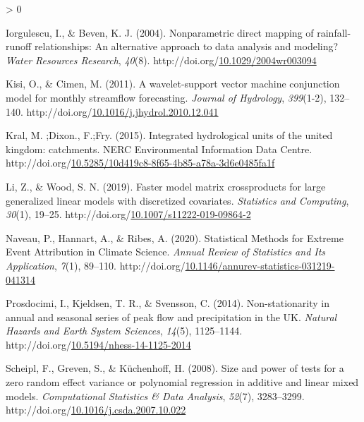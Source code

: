 \documentclass[12pt,oneside]{reedthesis}
\newlength{\cslhangindent}
\newenvironment{CSLReferences}[2] %
 {%
  \setlength{\parindent}{0pt}
  \ifodd #1 \everypar{\setlength{\hangindent}{\cslhangindent}}\ignorespaces\fi
  \ifnum #2 > 0
  \setlength{\parskip}{#2\baselineskip}
  \fi
 }%
 {}
\begin{document}
\begin{CSLReferences}{1}{0}
\leavevmode\hypertarget{ref-iorgulescu2004}{}%
Iorgulescu, I., \& Beven, K. J. (2004). Nonparametric direct mapping of rainfall-runoff relationships: An alternative approach to data analysis and modeling? \emph{Water Resources Research}, \emph{40}(8). http://doi.org/\href{https://doi.org/10.1029/2004wr003094}{10.1029/2004wr003094}

\leavevmode\hypertarget{ref-kisi2011}{}%
Kisi, O., \& Cimen, M. (2011). A wavelet-support vector machine conjunction model for monthly streamflow forecasting. \emph{Journal of Hydrology}, \emph{399}(1-2), 132--140. http://doi.org/\href{https://doi.org/10.1016/j.jhydrol.2010.12.041}{10.1016/j.jhydrol.2010.12.041}

\leavevmode\hypertarget{ref-10.5285ux2f10d419c8-8f65-4b85-a78a-3d6e0485fa1f}{}%
Kral, M. ;Dixon., F.;Fry. (2015). Integrated hydrological units of the united kingdom: catchments. NERC Environmental Information Data Centre. http://doi.org/\href{https://doi.org/10.5285/10d419c8-8f65-4b85-a78a-3d6e0485fa1f}{10.5285/10d419c8-8f65-4b85-a78a-3d6e0485fa1f}

\leavevmode\hypertarget{ref-li2019}{}%
Li, Z., \& Wood, S. N. (2019). Faster model matrix crossproducts for large generalized linear models with discretized covariates. \emph{Statistics and Computing}, \emph{30}(1), 19--25. http://doi.org/\href{https://doi.org/10.1007/s11222-019-09864-2}{10.1007/s11222-019-09864-2}

\leavevmode\hypertarget{ref-naveau2020}{}%
Naveau, P., Hannart, A., \& Ribes, A. (2020). Statistical Methods for Extreme Event Attribution in Climate Science. \emph{Annual Review of Statistics and Its Application}, \emph{7}(1), 89--110. http://doi.org/\href{https://doi.org/10.1146/annurev-statistics-031219-041314}{10.1146/annurev-statistics-031219-041314}

\leavevmode\hypertarget{ref-prosdocimi2014}{}%
Prosdocimi, I., Kjeldsen, T. R., \& Svensson, C. (2014). Non-stationarity in annual and seasonal series of peak flow and precipitation in the UK. \emph{Natural Hazards and Earth System Sciences}, \emph{14}(5), 1125--1144. http://doi.org/\href{https://doi.org/10.5194/nhess-14-1125-2014}{10.5194/nhess-14-1125-2014}

\leavevmode\hypertarget{ref-scheipl2008}{}%
Scheipl, F., Greven, S., \& Küchenhoff, H. (2008). Size and power of tests for a zero random effect variance or polynomial regression in additive and linear mixed models. \emph{Computational Statistics \& Data Analysis}, \emph{52}(7), 3283--3299. http://doi.org/\href{https://doi.org/10.1016/j.csda.2007.10.022}{10.1016/j.csda.2007.10.022}


\end{CSLReferences}
\end{document}
